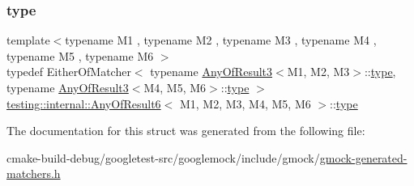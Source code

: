 \subsubsection{\texorpdfstring{type}{type}}
{\footnotesize\ttfamily template$<$typename M1 , typename M2 , typename M3 , typename M4 , typename M5 , typename M6 $>$ \\
typedef Either\+Of\+Matcher$<$ typename \mbox{\hyperlink{structtesting_1_1internal_1_1AnyOfResult3}{Any\+Of\+Result3}}$<$M1, M2, M3$>$\+::\mbox{\hyperlink{structtesting_1_1internal_1_1AnyOfResult6_a15837eb05d9ac5a76c20d344a4988dd1}{type}}, typename \mbox{\hyperlink{structtesting_1_1internal_1_1AnyOfResult3}{Any\+Of\+Result3}}$<$M4, M5, M6$>$\+::\mbox{\hyperlink{structtesting_1_1internal_1_1AnyOfResult6_a15837eb05d9ac5a76c20d344a4988dd1}{type}} $>$ \mbox{\hyperlink{structtesting_1_1internal_1_1AnyOfResult6}{testing\+::internal\+::\+Any\+Of\+Result6}}$<$ M1, M2, M3, M4, M5, M6 $>$\+::\mbox{\hyperlink{structtesting_1_1internal_1_1AnyOfResult6_a15837eb05d9ac5a76c20d344a4988dd1}{type}}}



The documentation for this struct was generated from the following file\+:\begin{DoxyCompactItemize}
\item 
cmake-\/build-\/debug/googletest-\/src/googlemock/include/gmock/\mbox{\hyperlink{gmock-generated-matchers_8h}{gmock-\/generated-\/matchers.\+h}}\end{DoxyCompactItemize}
